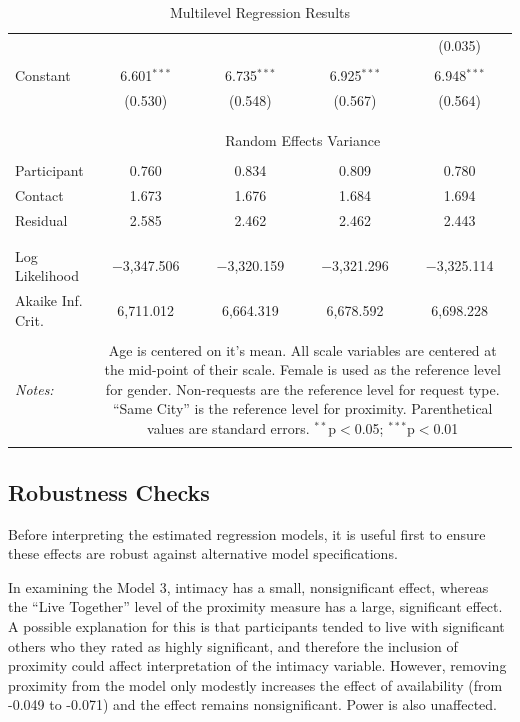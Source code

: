 \documentclass[12pt]{nuthesis}	%
\begin{document}
\begin{table}[!htbp]
\begin{tabular}{@{\extracolsep{5pt}}lcccc}
  &  &  &  & (0.035) \\ 
  & & & & \\ 
 Constant & 6.601$^{***}$ & 6.735$^{***}$ & 6.925$^{***}$ & 6.948$^{***}$ \\ 
  & (0.530) & (0.548) & (0.567) & (0.564) \\ 
  & & & & \\ 
\hline \\[-1.8ex] 
\\[-1.8ex] & \multicolumn{4}{c}{Random Effects Variance} \\ 
\hline \\[-1.8ex] 
 Participant & 0.760 & 0.834 & 0.809 & 0.780 \\
 Contact & 1.673 & 1.676 & 1.684 & 1.694 \\
 Residual & 2.585 & 2.462 & 2.462 & 2.443 \\
 \hline \\[-1.8ex] 
 \hline \\[-1.8ex] 
Log Likelihood & $-$3,347.506 & $-$3,320.159 & $-$3,321.296 & $-$3,325.114 \\ 
Akaike Inf. Crit. & 6,711.012 & 6,664.319 & 6,678.592 & 6,698.228 \\ 
\hline 
\hline \\[-1.8ex] 
\textit{Notes:}  & \multicolumn{4}{p{\dimexpr 0.55\linewidth-2\tabcolsep}}{ Age is centered on it's mean. All scale variables are centered at the mid-point of their scale. Female is used as the reference level for gender. Non-requests are the reference level for request type. ``Same City'' is the reference level for proximity. Parenthetical values are standard errors. $^{**}$p$<$0.05; $^{***}$p$<$0.01} \\ 
\\
\end{tabular} 
  \caption{Multilevel Regression Results} 
  \label{tab:fixed_effects} 
\end{table} 

\subsection{Robustness Checks}

Before interpreting the estimated regression models, it is useful first to ensure these effects are robust against alternative model specifications.

In examining the Model 3, intimacy has a small, nonsignificant effect, whereas the ``Live Together'' level of the proximity measure has a large, significant effect. A possible explanation for this is that participants tended to live with significant others who they rated as highly significant, and therefore the inclusion of proximity could affect interpretation of the intimacy variable. However, removing proximity from the model only modestly increases the effect of availability (from -0.049 to -0.071) and the effect remains nonsignificant. Power is also unaffected.
\end{document}
